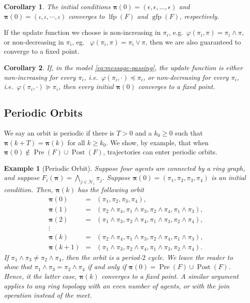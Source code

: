 \documentclass[conference]{ieeeconf}
\newcommand{\N}{\mathcal{N}}
\newcommand{\profile}{\boldsymbol{\pi}}
\newcommand{\join}{\vee}
\newcommand{\meet}{\wedge}
\newcommand{\bigmeet}{\bigwedge}
\renewcommand{\geq}{\geqslant}
\DeclareMathOperator{\Pre}{Pre}
\DeclareMathOperator{\Post}{Post}
\DeclareMathOperator{\lfp}{lfp}
\DeclareMathOperator{\gfp}{gfp}
\newtheorem{corollary}{Corollary}
\newtheorem{example}{Example}
\begin{document}
\begin{corollary}
    The initial conditions $\profile(0) = (\epsilon,\epsilon,\dots,\epsilon)$ and $\profile(0) = (\iota,\iota, \cdots, \iota)$ converges to $\lfp(F)$ and $\gfp(F)$, respectively.
\end{corollary}

If the update function we choose is non-increasing in $\pi_i$, e.g.~$\varphi(\pi_i,\pi) = \pi_i \meet \pi$, or non-decreasing in $\pi_i$, eg.~ $\varphi(\pi_i,\pi) = \pi_i \join \pi$, then we are also guaranteed to converge to a fixed point.

\begin{corollary}
    If, in the model \eqref{eq:message-passing}, the update function is either non-increasing for every $\pi_i$, i.e.~$\varphi(\pi_i,\cdot) \preceq \pi_i$, or non-decreasing for every $\pi_i$, i.e.~$\varphi(\pi_i,\cdot) \succeq \pi_i$, then every initial $\profile(0)$ converges to a fixed point.
\end{corollary}

\subsection{Periodic Orbits}
We say an orbit is periodic if there is $T>0$ and a $k_0 \geq 0$ such that $\profile(k+T) = \profile(k)$ for all $k \geq k_0$. We show, by example, that when $\profile(0) \notin \Pre(F) \cup \Post(F)$, trajectories can enter periodic orbits.

\begin{example}[Periodic Orbit]
    Suppose four agents are connected by a ring graph, and suppose $F_i(\profile) = \bigmeet_{j \in \N_i} \pi_j$. Suppose $\profile(0) = (\pi_1,\pi_2,\pi_3,\pi_4)$ is an initial condition. Then, $\profile(k)$ has the following orbit
    \begin{align*}
        \profile(0) &=& \left( \pi_1,\pi_2,\pi_3,\pi_4 \right), \\
        \profile(1) &=& \left( \pi_2 \meet \pi_4, \pi_1 \meet \pi_3, \pi_2 \meet \pi_4, \pi_1 \meet \pi_3 \right), \\
        \profile(2) &=& \left( \pi_1 \meet \pi_3, \pi_2 \meet \pi_4, \pi_1 \meet \pi_3, \pi_2 \meet \pi_4 \right), \\
        \vdots &&  \\
        \profile(k) &=& \left( \pi_2 \meet \pi_4, \pi_1 \meet \pi_3, \pi_2 \meet \pi_4, \pi_1 \meet \pi_3 \right), \\
        \profile(k+1) &=& \left( \pi_1 \meet \pi_3, \pi_2 \meet \pi_4, \pi_1 \meet \pi_3, \pi_2 \meet \pi_4 \right).
    \end{align*}
    If $\pi_1 \meet \pi_3 \neq \pi_2 \meet \pi_4$, then the orbit is a period-$2$ cycle. We leave the reader to show that $\pi_1 \meet \pi_3 = \pi_2 \meet \pi_4$ if and only if $\profile(0) = \Pre(F) \cup \Post(F)$. Hence, it the latter case, $\profile(k)$ converges to a fixed point. A similar argument applies to any ring topology with an even number of agents, or with the join operation instead of the meet.
\end{example}
\end{document}
